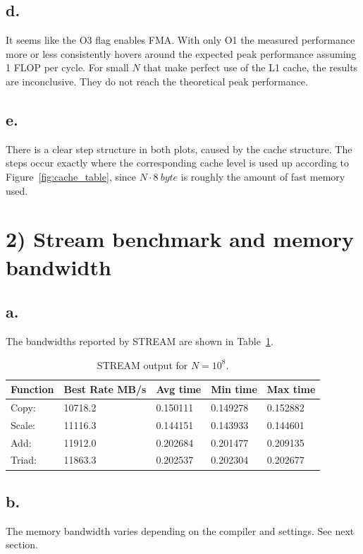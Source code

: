 \documentclass[a4paper, 11pt]{article}
\begin{document}
\subsection*{d.}
It seems like the O3 flag enables FMA. With only O1 the measured performance
more or less consistently hovers around the expected peak performance assuming
1 FLOP per cycle. For small $N$ that make perfect use of the L1 cache, the
results are inconclusive. They do not reach the theoretical peak performance. 

\subsection*{e.}
There is a clear step structure in both plots, caused by the cache structure.
The steps occur exactly where the corresponding cache level is used up
according to Figure~\ref{fig:cache_table}, since $N\cdot\SI{8}{byte}$ is
roughly the amount of fast memory used.

\section*{2) Stream benchmark and memory bandwidth}
\subsection*{a.}
The bandwidths reported by STREAM are shown in Table~\ref{tab:stream}.
\begin{table}
  \centering
  \begin{tabular}{lllll}
    Function  &Best Rate MB/s &   Avg time  &   Min time  &  Max time \\
    \hline 
    Copy:     &      10718.2  &   0.150111  &   0.149278  &   0.152882 \\
    Scale:    &      11116.3  &   0.144151  &   0.143933  &   0.144601 \\
    Add:      &      11912.0  &   0.202684  &   0.201477  &   0.209135 \\
    Triad:    &      11863.3  &   0.202537  &   0.202304  &   0.202677 \\
  \end{tabular}
  \caption{STREAM output for $N=10^{8}$.}
  \label{tab:stream}
\end{table}

\subsection*{b.}
The memory bandwidth varies depending on the compiler and settings. See next
section.
\end{document}
